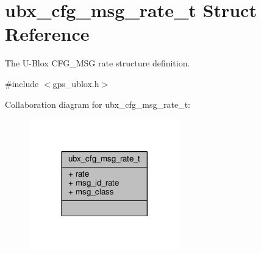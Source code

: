 \hypertarget{structubx__cfg__msg__rate__t}{\section{ubx\+\_\+cfg\+\_\+msg\+\_\+rate\+\_\+t Struct Reference}
\label{structubx__cfg__msg__rate__t}
}


The U-\/\+Blox C\+F\+G\+\_\+\+M\+S\+G rate structure definition.  




{\ttfamily \#include $<$gps\+\_\+ublox.\+h$>$}



Collaboration diagram for ubx\+\_\+cfg\+\_\+msg\+\_\+rate\+\_\+t\+:
\nopagebreak
\begin{figure}[H]
\begin{center}
\leavevmode
\includegraphics[width=185pt]{structubx__cfg__msg__rate__t__coll__graph}
\end{center}
\end{figure}
